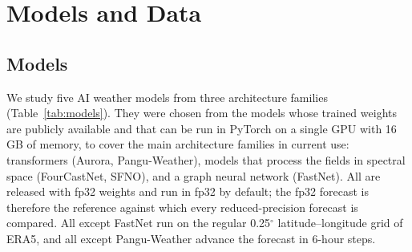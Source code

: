 \section{Models and Data}
\label{sec:models-and-data}

\subsection{Models}
\label{sec:models}

We study five AI weather models from three architecture families
(Table~\ref{tab:models}). They were chosen
from the models whose trained weights are publicly available and that
can be run in PyTorch on a single GPU with 16\,GB of memory, to cover
the main architecture families in current use: transformers (Aurora, Pangu-Weather), models that process
the fields in spectral space (FourCastNet, SFNO), and a graph neural
network (FastNet). All are
released with fp32 weights and run in fp32 by default; the fp32 forecast
is therefore the reference against which every reduced-precision
forecast is compared. All except FastNet run on the regular
0.25$^\circ$ latitude--longitude grid of ERA5, and all except
Pangu-Weather advance the forecast in 6-hour steps.

